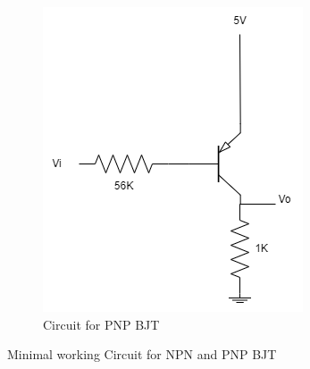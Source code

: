 \begin{figure}[H]
\begin{subfigure}{0.4\textwidth}
                \includegraphics[width=1\linewidth]{Experiment_05/Circuits/Lab5b.png}
                \caption{Circuit for PNP BJT}
                \label{cir:5PNP}
            \end{subfigure}
            \caption{Minimal working Circuit for NPN and PNP BJT}
        \end{figure}

